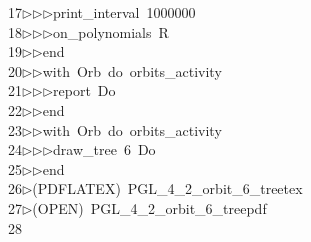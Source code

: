 \begin{tabbing}
17\>$\triangleright$\>$\triangleright$\>$\triangleright$\>print\_interval\ 1000000\ \\[0pt]
18\>$\triangleright$\>$\triangleright$\>$\triangleright$\>on\_polynomials\ R\ \\[0pt]
19\>$\triangleright$\>$\triangleright$\>end\ \\[0pt]
20\>$\triangleright$\>$\triangleright$\>with\ Orb\ do\ orbits\_activity\ \\[0pt]
21\>$\triangleright$\>$\triangleright$\>$\triangleright$\>report\ Do\ \\[0pt]
22\>$\triangleright$\>$\triangleright$\>end\ \\[0pt]
23\>$\triangleright$\>$\triangleright$\>with\ Orb\ do\ orbits\_activity\ \\[0pt]
24\>$\triangleright$\>$\triangleright$\>$\triangleright$\>draw\_tree\ 6\ Do\ \\[0pt]
25\>$\triangleright$\>$\triangleright$\>end\\[0pt]
26\>$\triangleright$\>(PDFLATEX)\ PGL\_4\_2\_orbit\_6\_treetex\\[0pt]
27\>$\triangleright$\>(OPEN)\ PGL\_4\_2\_orbit\_6\_treepdf\\[0pt]
28\>\end{tabbing}
